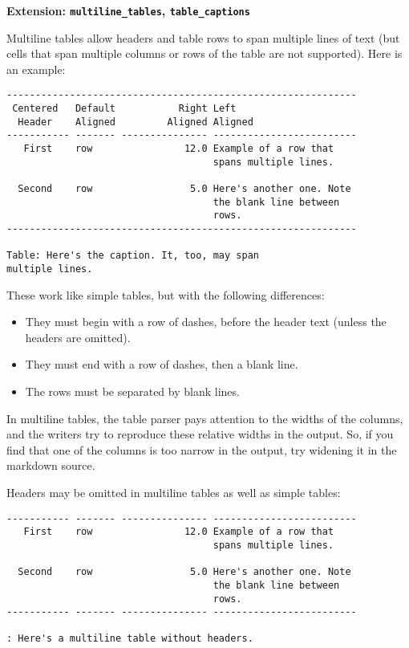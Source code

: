 \documentclass[]{article}
\begin{document}
\textbf{Extension: \texttt{multiline\_tables}, \texttt{table\_captions}}

Multiline tables allow headers and table rows to span multiple lines of
text (but cells that span multiple columns or rows of the table are not
supported). Here is an example:

\begin{verbatim}
-------------------------------------------------------------
 Centered   Default           Right Left
  Header    Aligned         Aligned Aligned
----------- ------- --------------- -------------------------
   First    row                12.0 Example of a row that
                                    spans multiple lines.

  Second    row                 5.0 Here's another one. Note
                                    the blank line between
                                    rows.
-------------------------------------------------------------

Table: Here's the caption. It, too, may span
multiple lines.
\end{verbatim}

These work like simple tables, but with the following differences:

\begin{itemize}
\itemsep1pt\parskip0pt
\item
  They must begin with a row of dashes, before the header text (unless
  the headers are omitted).
\item
  They must end with a row of dashes, then a blank line.
\item
  The rows must be separated by blank lines.
\end{itemize}

In multiline tables, the table parser pays attention to the widths of
the columns, and the writers try to reproduce these relative widths in
the output. So, if you find that one of the columns is too narrow in the
output, try widening it in the markdown source.

Headers may be omitted in multiline tables as well as simple tables:

\begin{verbatim}
----------- ------- --------------- -------------------------
   First    row                12.0 Example of a row that
                                    spans multiple lines.

  Second    row                 5.0 Here's another one. Note
                                    the blank line between
                                    rows.
----------- ------- --------------- -------------------------

: Here's a multiline table without headers.
\end{verbatim}
\end{document}
